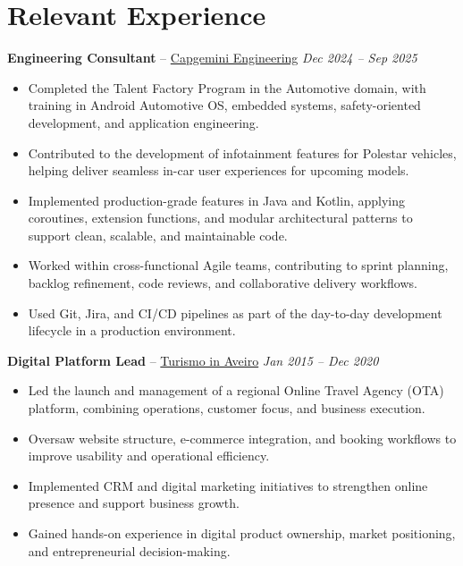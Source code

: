 \documentclass[11pt]{article}
\begin{document}
\vspace{-8.5pt}

\section*{Relevant Experience}
\textbf{Engineering Consultant} -- \href{https://www.capgemini.com/pt-en/}{Capgemini Engineering} \hfill \textit{Dec 2024 -- Sep 2025} \\
\vspace{-6pt}
\begin{itemize}
  \item Completed the Talent Factory Program in the Automotive domain, with training in Android Automotive OS, embedded systems, safety-oriented development, and application engineering.
  \item Contributed to the development of infotainment features for Polestar vehicles, helping deliver seamless in-car user experiences for upcoming models.
  \item Implemented production-grade features in Java and Kotlin, applying coroutines, extension functions, and modular architectural patterns to support clean, scalable, and maintainable code.
  \item Worked within cross-functional Agile teams, contributing to sprint planning, backlog refinement, code reviews, and collaborative delivery workflows.
  \item Used Git, Jira, and CI/CD pipelines as part of the day-to-day development lifecycle in a production environment.
\end{itemize}

\textbf{Digital Platform Lead} -- \href{https://turismoinaveiro.com}{Turismo in Aveiro} \hfill \textit{Jan 2015 -- Dec 2020} \\
\vspace{-6pt}
\begin{itemize}
  \item Led the launch and management of a regional Online Travel Agency (OTA) platform, combining operations, customer focus, and business execution.
  \item Oversaw website structure, e-commerce integration, and booking workflows to improve usability and operational efficiency.
  \item Implemented CRM and digital marketing initiatives to strengthen online presence and support business growth.
  \item Gained hands-on experience in digital product ownership, market positioning, and entrepreneurial decision-making.
\end{itemize}
\end{document}

